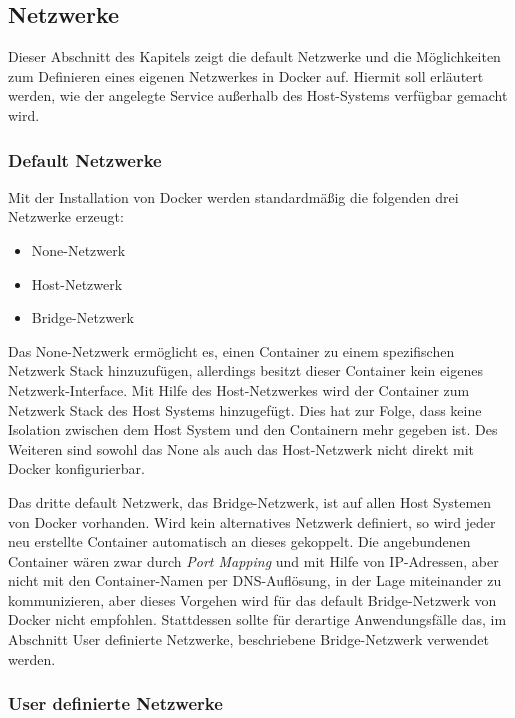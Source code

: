 \subsection{Netzwerke}

Dieser Abschnitt des Kapitels zeigt die default Netzwerke und die Möglichkeiten zum Definieren eines eigenen Netzwerkes in Docker auf.
Hiermit soll erläutert werden, wie der angelegte Service außerhalb des Host-Systems verfügbar gemacht wird.

\subsubsection{Default Netzwerke}

Mit der Installation von Docker werden standardmäßig die folgenden drei Netzwerke erzeugt:

\begin{itemize}
	\item None-Netzwerk
	\item Host-Netzwerk
	\item Bridge-Netzwerk
\end{itemize}

Das None-Netzwerk ermöglicht es, einen Container zu einem spezifischen Netzwerk Stack hinzuzufügen, allerdings besitzt dieser Container kein eigenes Netzwerk-Interface. 
Mit Hilfe des Host-Netzwerkes wird der Container zum Netzwerk Stack des Host Systems hinzugefügt.
Dies hat zur Folge, dass keine Isolation zwischen dem Host System und den Containern mehr gegeben ist.
Des Weiteren sind sowohl das None als auch das Host-Netzwerk nicht direkt mit Docker konfigurierbar.

Das dritte default Netzwerk, das Bridge-Netzwerk, ist auf allen Host Systemen von Docker vorhanden.
Wird kein alternatives Netzwerk definiert, so wird jeder neu erstellte Container automatisch an dieses gekoppelt.
Die angebundenen Container wären zwar durch \textit{Port Mapping} und mit Hilfe von IP-Adressen, aber nicht mit den Container-Namen per DNS-Auflösung, in der Lage miteinander zu kommunizieren, aber dieses Vorgehen wird für das default Bridge-Netzwerk von Docker nicht empfohlen.
Stattdessen sollte für derartige Anwendungsfälle das, im Abschnitt User definierte Netzwerke, beschriebene Bridge-Netzwerk verwendet werden.

\subsubsection{User definierte Netzwerke}

